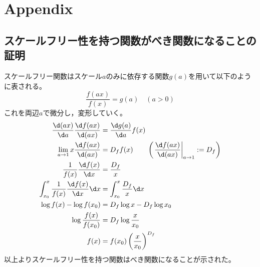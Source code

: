 \documentclass[autodetect-engine,dvi=dvipdfmx,a4paper,ja=standard,oneside,openany,11pt,draft]{bxjsbook}
\begin{document}
\appendix
\chapter{Appendix}
\section{スケールフリー性を持つ関数がべき関数になることの証明}
スケールフリー関数はスケール$a$のみに依存する関数$g(a)$を用いて以下のように表される。
\begin{equation}
  \frac{f(ax)}{f(x)}=g(a) \quad (a>0)
\end{equation}
これを両辺$a$で微分し，変形していく。
\begin{equation}
  \begin{split}
    \frac{\d (ax)}{\d a}\frac{\d f(ax)}{\d (ax)}          & =\frac{\d g(a)}{\d a}f(x)                                                       \\
    \lim_{a\to 1}x\frac{\d f(ax)}{\d (ax)}                & =D_f f(x) \qquad\left(\left.\frac{\d f(ax)}{\d (ax)}\right|_{a\to1}:=D_f\right) \\
    \frac{1}{f(x)}\frac{\d f(x)}{\d x}                    & =\frac{D_f}{x}                                                                  \\
    \int_{x_0}^{x} \frac{1}{f(x)}\frac{\d f(x)}{\d x}\d x & =\int_{x_0}^{x} \frac{D_f}{x}\d x                                               \\
    \log f(x)-\log f(x_0)                                 & =D_f\log x-D_f\log x_0                                                          \\
    \log \frac{f(x)}{f(x_0)}                              & =D_f\log \frac{x}{x_0}                                                          \\
    f(x)                                                  & =f(x_0)\left(\frac{x}{x_0}\right)^{D_f}
  \end{split}
\end{equation}
以上よりスケールフリー性を持つ関数はべき関数になることが示された。
\ifdraft{
  
  
}{}
\end{document}
